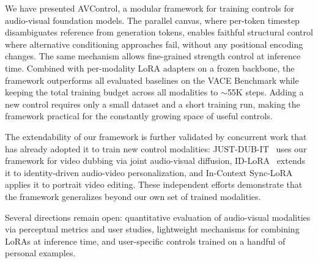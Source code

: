 We have presented AVControl, a modular framework for training controls for audio-visual foundation models. The parallel canvas, where per-token timestep disambiguates reference from generation tokens, enables faithful structural control where alternative conditioning approaches fail, without any positional encoding changes. The same mechanism allows fine-grained strength control at inference time. Combined with per-modality LoRA adapters on a frozen backbone, the framework outperforms all evaluated baselines on the VACE Benchmark while keeping the total training budget across all modalities to ${\sim}$55K steps. Adding a new control requires only a small dataset and a short training run, making the framework practical for the constantly growing space of useful controls.

The extendability of our framework is further validated by concurrent work that has already adopted it to train new control modalities: JUST-DUB-IT~\cite{chen2026justdubit} uses our framework for video dubbing via joint audio-visual diffusion, ID-LoRA~\cite{dahan2026idlora} extends it to identity-driven audio-video personalization, and In-Context Sync-LoRA~\cite{polaczek2025synclora} applies it to portrait video editing. These independent efforts demonstrate that the framework generalizes beyond our own set of trained modalities.

Several directions remain open: quantitative evaluation of audio-visual modalities via perceptual metrics and user studies, lightweight mechanisms for combining LoRAs at inference time, and user-specific controls trained on a handful of personal examples.
